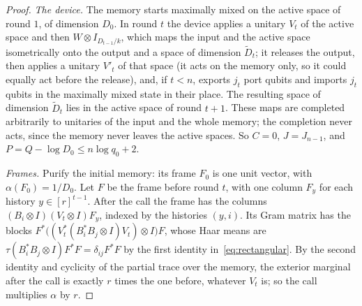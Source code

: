 \begin{proof}
\emph{The device.} The memory starts maximally mixed on the active space of round $1$, of dimension $D_0$. In round $t$ the device applies a unitary
$V_t$ of the active space and then $W\otimes I_{D_{t-1}/k}$, which maps the input and the active space isometrically onto the output and a space of
dimension $\widetilde D_t$; it releases the output, then applies a unitary $V'_t$ of that space (it acts on the memory only, so it could equally act before the release), and, if $t<n$, exports $j_t$ port qubits and imports $j_t$
qubits in the maximally mixed state in their place. The resulting space of dimension $\widetilde D_t$ lies in the active space of round $t+1$. These
maps are completed arbitrarily to unitaries of the input and the whole memory; the completion never acts, since the memory never leaves the
active spaces. So $C=0$, $J=J_{n-1}$, and $P=Q-\log D_0\le n\log q_0+2$.

\emph{Frames.} Purify the initial memory: its frame $F_0$ is one unit vector, with $\alpha(F_0)=1/D_0$. Let $F$ be the frame before round $t$, with one
column $F_y$ for each history $y\in[r]^{t-1}$. After the call the frame has the columns $(B_i\otimes I)(V_t\otimes I)F_y$, indexed by the histories
$(y,i)$. Its Gram matrix has the blocks $F^*\bigl((V_t^*(B_i^*B_j\otimes I)V_t)\otimes I\bigr)F$, whose Haar means are
$\tau(B_i^*B_j\otimes I)F^*F=\delta_{ij}F^*F$ by the first identity in~\eqref{eq:rectangular}. By the second identity and cyclicity of the partial trace
over the memory, the exterior marginal after the call is exactly $r$ times the one before, whatever $V_t$ is; so the call multiplies $\alpha$ by $r$.


\end{proof}
